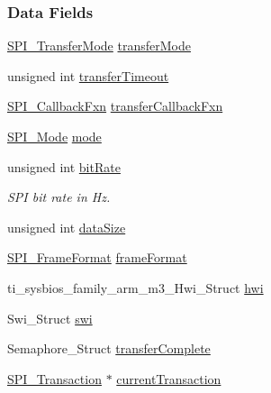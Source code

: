 \subsubsection*{Data Fields}
\begin{DoxyCompactItemize}
\item 
\hyperlink{_s_p_i_8h_ab9ea76c6529d6076eee5e1c4a5a92c6f}{S\+P\+I\+\_\+\+Transfer\+Mode} \hyperlink{struct_s_p_i_c_c26_x_x_d_m_a___object_a12fcb093793c5a34ff32f9e29a3d7cf4}{transfer\+Mode}
\item 
unsigned int \hyperlink{struct_s_p_i_c_c26_x_x_d_m_a___object_a6a89c25b77087f8298df74b52fde9615}{transfer\+Timeout}
\item 
\hyperlink{_s_p_i_8h_a207e2d5a7e7ea5606b6995b6485ca015}{S\+P\+I\+\_\+\+Callback\+Fxn} \hyperlink{struct_s_p_i_c_c26_x_x_d_m_a___object_acee695558ae9a3f4108d8322c41b5c2c}{transfer\+Callback\+Fxn}
\item 
\hyperlink{_s_p_i_8h_a60a7e3d74577b38aa79ea6983362f942}{S\+P\+I\+\_\+\+Mode} \hyperlink{struct_s_p_i_c_c26_x_x_d_m_a___object_acd71f040d34bcc9de82225b8e99bc7a2}{mode}
\item 
unsigned int \hyperlink{struct_s_p_i_c_c26_x_x_d_m_a___object_a056c615ea06764de3732a88bc0933422}{bit\+Rate}
\begin{DoxyCompactList}\small\item\em S\+P\+I bit rate in Hz. \end{DoxyCompactList}\item 
unsigned int \hyperlink{struct_s_p_i_c_c26_x_x_d_m_a___object_ad5f703751ac0581fd69ad7b984bea44a}{data\+Size}
\item 
\hyperlink{_s_p_i_8h_a4e1f33555dfa8147205af5b266f3a489}{S\+P\+I\+\_\+\+Frame\+Format} \hyperlink{struct_s_p_i_c_c26_x_x_d_m_a___object_a8a73c6d84d6a8080f76e7b97421d2733}{frame\+Format}
\item 
ti\+\_\+sysbios\+\_\+family\+\_\+arm\+\_\+m3\+\_\+\+Hwi\+\_\+\+Struct \hyperlink{struct_s_p_i_c_c26_x_x_d_m_a___object_ac7e6dd667c4ea0d3529cecd4899ad6a0}{hwi}
\item 
Swi\+\_\+\+Struct \hyperlink{struct_s_p_i_c_c26_x_x_d_m_a___object_ad1e027f77895b756d5f8ad5529fb22a4}{swi}
\item 
Semaphore\+\_\+\+Struct \hyperlink{struct_s_p_i_c_c26_x_x_d_m_a___object_a88610fb9250608f777900d3652f5115f}{transfer\+Complete}
\item 
\hyperlink{struct_s_p_i___transaction}{S\+P\+I\+\_\+\+Transaction} $\ast$ \hyperlink{struct_s_p_i_c_c26_x_x_d_m_a___object_a4a6ed13c8b6215e83ba22084f1ffc69b}{current\+Transaction}

\end{DoxyCompactItemize}
